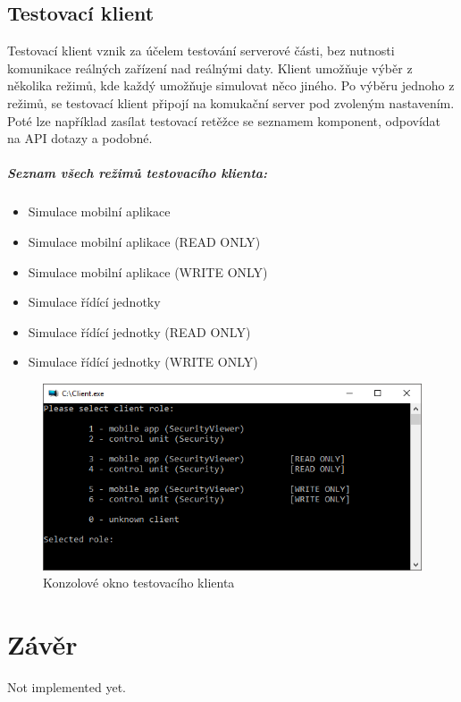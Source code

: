 \documentclass[FM,DP]{tulthesis}  %
\begin{document}
\section{Testovací klient}
Testovací klient vznik za účelem testování serverové části, bez nutnosti komunikace reálných zařízení nad reálnými daty. Klient umožňuje výběr z několika režimů, kde každý umožňuje simulovat něco jiného. Po výběru jednoho z režimů, se testovací klient připojí na komukační server pod zvoleným nastavením. Poté lze například zasílat testovací retěžce se seznamem komponent, odpovídat na API dotazy a podobné.

\paragraph{Seznam všech režimů testovacího klienta:}
\begin{itemize}
\item Simulace mobilní aplikace
\item Simulace mobilní aplikace (READ ONLY)
\item Simulace mobilní aplikace (WRITE ONLY)
\item Simulace řídící jednotky
\item Simulace řídící jednotky (READ ONLY)
\item Simulace řídící jednotky (WRITE ONLY)
\end{itemize}

\begin{figure}[H]
\begin{center}
\includegraphics[width=\textwidth]{images/testingClient.png}
\caption{Konzolové okno testovacího klienta}
\label{image}
\end{center}
\end{figure}



\chapter{Závěr}
Not implemented yet.
\end{document}
